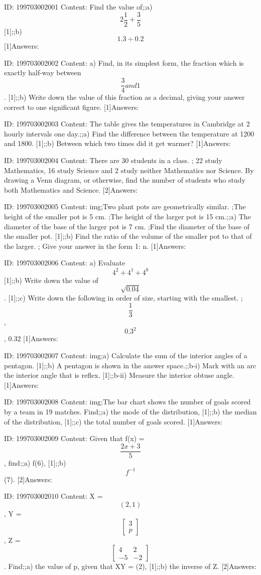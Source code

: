 \documentclass{article}
\begin{document}
ID: 199703002001
Content:
Find the value of;;a) $$2\frac{1}{2}+\frac{3}{5}$$ [1];;b) $$1.3\div 0.2$$ [1]Answers:

ID: 199703002002
Content:
a) Find, in its simplest form, the fraction which is exactly half-way between $$\frac{3}{4} and 1$$. [1];;b) Write down the value of this fraction as a decimal, giving your answer correct to one significant figure.  [1]Answers:

ID: 199703002003
Content:
The table gives the temperatures in Cambridge at 2 hourly intervals one day.;;a) Find the difference between the temperature at 1200 and 1800.  [1];;b) Between which two times did it get warmer?  [1]Answers:

ID: 199703002004
Content:
There are 30 students in a class. ; 22 study Mathematics, 16 study Science and 2 study neither Mathematics nor Science. By drawing a Venn diagram, or otherwise, find the number of students who study both Mathematics and Science. [2]Answers:

ID: 199703002005
Content:
img;Two plant pots are geometrically similar. ;The height of the smaller pot is 5 cm. ;The height of the larger pot is 15 cm.;;a) The diameter of the base of the larger pot is 7 cm. ;Find the diameter of the base of the smaller pot. [1];;b) Find the ratio of the volume of the smaller pot to that of the larger. ; Give your answer in the form 1: n. [1]Answers:

ID: 199703002006
Content:
a) Evaluate $$4^2+4^1+4^0$$ [1];;b) Write down the value of $$\sqrt{0.04}$$. [1];;c) Write down the following in order of size, starting with the smallest. ;$$\frac{1}{3}$$, $$0.3^{2}$$, 0.32 [1]Answers:

ID: 199703002007
Content:
img;a) Calculate the sum of the interior angles of a pentagon. [1];;b) A pentagon is shown in the answer space.;;b-i) Mark with an arc the interior angle that is reflex. [1];;b-ii) Measure the interior obtuse angle. [1]Answers:

ID: 199703002008
Content:
img;The bar chart shows the number of goals scored by a team in 19 matches. Find;;a) the mode of the distribution, [1];;b) the median of the distribution, [1];;c) the total number of goals scored. [1]Answers:

ID: 199703002009
Content:
Given that f(x) =$$\frac{2x+3}{5}$$, find;;a) f(6), [1];;b) $$f^{-1}$$(7). [2]Answers:

ID: 199703002010
Content:
X = $$(2, 1)$$, Y =$$\begin{bmatrix}3\\p\end{bmatrix}$$, Z =$$\begin{bmatrix}4&2\\-5&-2\end{bmatrix}$$. Find;;a) the value of p, given that XY = (2), [1];;b) the inverse of Z. [2]Answers:
\end{document}
